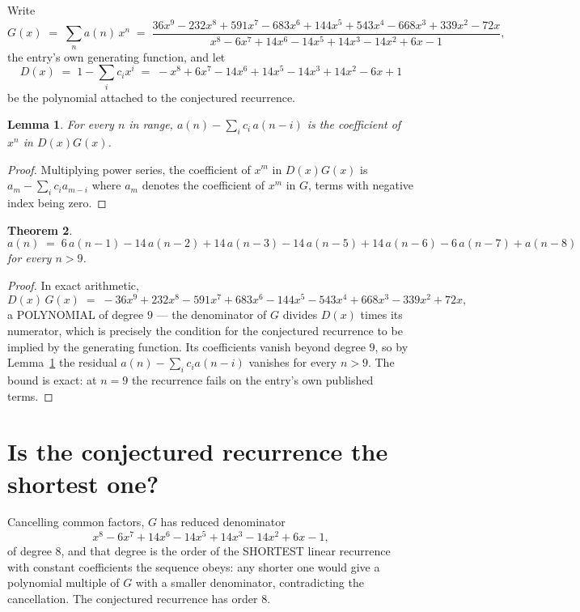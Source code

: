 \documentclass[11pt,a4paper]{article}
\theoremstyle{plain}
\newtheorem{theorem}{Theorem}
\newtheorem{lemma}[theorem]{Lemma}
\theoremstyle{definition}
\begin{document}
Write
\[
G(x)\;=\;\sum_{n}a(n)\,x^{n}\;=\;\frac{36 x^{9} - 232 x^{8} + 591 x^{7} - 683 x^{6} + 144 x^{5} + 543 x^{4} - 668 x^{3} + 339 x^{2} - 72 x}{x^{8} - 6 x^{7} + 14 x^{6} - 14 x^{5} + 14 x^{3} - 14 x^{2} + 6 x - 1},
\]
the entry's own generating function, and let
\[
D(x)\;=\;1-\sum_i c_i x^{i}\;=\;- x^{8} + 6 x^{7} - 14 x^{6} + 14 x^{5} - 14 x^{3} + 14 x^{2} - 6 x + 1
\]
be the polynomial attached to the conjectured recurrence.

\begin{lemma}\label{lem:key}
For every $n$ in range, $a(n)-\sum_i c_i\,a(n-i)$ is the coefficient of $x^{n}$ in
$D(x)G(x)$.
\end{lemma}

\begin{proof}
Multiplying power series, the coefficient of $x^{m}$ in $D(x)G(x)$ is
$a_m-\sum_i c_i a_{m-i}$ where $a_m$ denotes the coefficient of $x^{m}$ in $G$, terms with
negative index being zero.
\end{proof}

\begin{theorem}
\[
a(n)\;=\;6\,a(n-1) - 14\,a(n-2) + 14\,a(n-3) - 14\,a(n-5) + 14\,a(n-6) - 6\,a(n-7) + a(n-8)
\]
for every $n>9$.
\end{theorem}

\begin{proof}
In exact arithmetic,
\[
D(x)\,G(x)\;=\;- 36 x^{9} + 232 x^{8} - 591 x^{7} + 683 x^{6} - 144 x^{5} - 543 x^{4} + 668 x^{3} - 339 x^{2} + 72 x,
\]
a POLYNOMIAL of degree $9$ --- the denominator of $G$ divides $D(x)$ times its numerator,
which is precisely the condition for the conjectured recurrence to be implied by the
generating function. Its coefficients vanish beyond degree $9$, so by
Lemma~\ref{lem:key} the residual $a(n)-\sum_ic_ia(n-i)$ vanishes for every
$n>9$. The bound is exact: at $n=9$ the recurrence fails on the entry's own published terms.
\end{proof}

\section{Is the conjectured recurrence the shortest one?}

Cancelling common factors, $G$ has reduced denominator
\[
x^{8} - 6 x^{7} + 14 x^{6} - 14 x^{5} + 14 x^{3} - 14 x^{2} + 6 x - 1,
\]
of degree $8$, and that degree is the order of the SHORTEST linear recurrence with
constant coefficients the sequence obeys: any shorter one would give a polynomial multiple of
$G$ with a smaller denominator, contradicting the cancellation. The conjectured recurrence has
order $8$.
\end{document}
